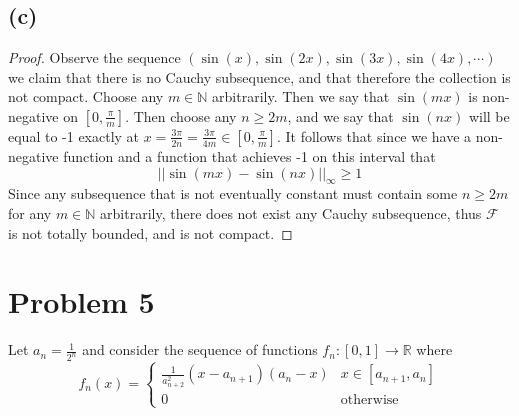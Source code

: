 \documentclass{article}
\theoremstyle{definition}
\begin{document}
\subsection*{(c)}
    \begin{proof}
        Observe the sequence $(\sin(x), \sin(2x), \sin(3x), \sin(4x), \cdots)$ we claim that there is no Cauchy subsequence, and that therefore
        the collection is not compact. Choose any $m \in \mathbb{N}$ arbitrarily. Then we say that $\sin(mx)$ is non-negative on $[0, \frac{\pi}{m}]$.
        Then choose any $n \geqslant 2m$, and we say that $\sin(nx)$ will be equal to -1 exactly at $x = \frac{3\pi}{2n} = \frac{3\pi}{4m} \in [0, \frac{\pi}{m}]$.
        It follows that since we have a non-negative function and a function that achieves -1 on this interval that 
        \[
            ||\sin(mx) - \sin(nx)||_\infty \geqslant 1
        \]
        Since any subsequence that is not eventually constant must contain some $n \geqslant 2m$ for any $m \in \mathbb{N}$ arbitrarily, there does not 
        exist any Cauchy subsequence, thus $\mathcal{F}$ is not totally bounded, and is not compact.
    \end{proof}
\section*{Problem 5}
\begin{mdframed}
    Let $a_n = \frac{1}{2^n}$ and consider the sequence of functions $f_n:[0,1] \rightarrow \mathbb{R}$ where
    \[
        f_n(x) = \begin{cases}
            \frac{1}{a_{n+2}^2}(x - a_{n+1})(a_n - x) & x \in [a_{n+1}, a_n]\\
            0 & \text{otherwise}
        \end{cases}
    \]
\end{mdframed}
\end{document}
